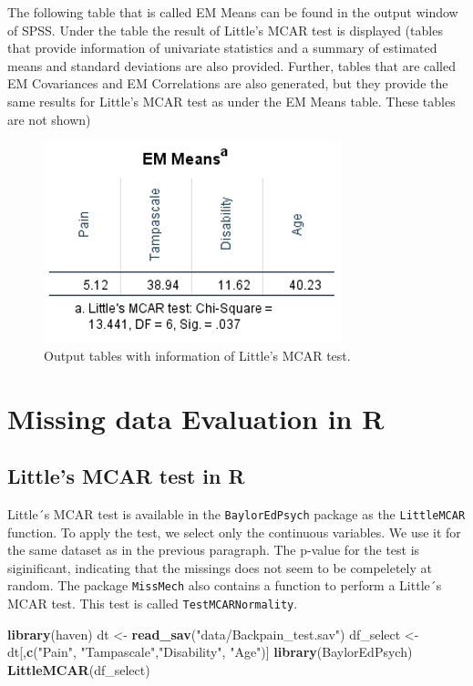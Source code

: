 \documentclass[
]{book}
\newenvironment{Shaded}{\begin{snugshade}}{\end{snugshade}}
\newcommand{\KeywordTok}[1]{\textcolor[rgb]{0.13,0.29,0.53}{\textbf{#1}}}
\newcommand{\NormalTok}[1]{#1}
\newcommand{\StringTok}[1]{\textcolor[rgb]{0.31,0.60,0.02}{#1}}
\begin{document}
The following table that is called EM Means can be found in the output
window of SPSS. Under the table the result of Little's MCAR test is
displayed (tables that provide information of univariate statistics and
a summary of estimated means and standard deviations are also provided.
Further, tables that are called EM Covariances and EM Correlations are
also generated, but they provide the same results for Little's MCAR test
as under the EM Means table. These tables are not shown)

\begin{figure}

{\centering \includegraphics[width=0.5\linewidth]{images/fig2.14} 

}

\caption{Output tables with information of Little’s MCAR test.}\label{fig:tab2-7}
\end{figure}

\hypertarget{missing-data-evaluation-in-r}{%
\section{Missing data Evaluation in
R}\label{missing-data-evaluation-in-r}}

\hypertarget{littles-mcar-test-in-r}{%
\subsection{Little's MCAR test in R}\label{littles-mcar-test-in-r}}

Little´s MCAR test is available in the \texttt{BaylorEdPsych} package as
the \texttt{LittleMCAR} function. To apply the test, we select only the
continuous variables. We use it for the same dataset as in the previous
paragraph. The p-value for the test is siginificant, indicating that the
missings does not seem to be compeletely at random. The package
\texttt{MissMech} also contains a function to perform a Little´s MCAR
test. This test is called \texttt{TestMCARNormality}.

\begin{Shaded}
\begin{Highlighting}[]
\KeywordTok{library}\NormalTok{(haven)}
\NormalTok{dt <-}\StringTok{ }\KeywordTok{read_sav}\NormalTok{(}\StringTok{"data/Backpain_test.sav"}\NormalTok{)}
\NormalTok{df_select <-}\StringTok{ }\NormalTok{dt[,}\KeywordTok{c}\NormalTok{(}\StringTok{"Pain"}\NormalTok{, }\StringTok{"Tampascale"}\NormalTok{,}\StringTok{"Disability"}\NormalTok{, }\StringTok{"Age"}\NormalTok{)]}
\KeywordTok{library}\NormalTok{(BaylorEdPsych)}
\KeywordTok{LittleMCAR}\NormalTok{(df_select)}
\end{Highlighting}
\end{Shaded}
\end{document}
